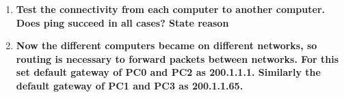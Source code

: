 \documentclass[a4paper,11pt]{article}
\begin{document}
\begin{enumerate}

    \item\textbf{  Test the connectivity from each computer to another computer. Does ping succeed in all
              cases? State reason}










    \item\textbf{ Now the different computers became on different networks, so routing is necessary to
              forward packets between networks. For this set default gateway of PC0 and PC2 as
              200.1.1.1. Similarly the default gateway of PC1 and PC3 as 200.1.1.65.}


\end{enumerate}
\end{document}
